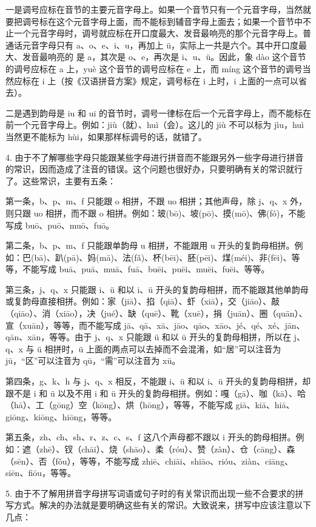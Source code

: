 一是调号应标在音节的主要元音字母上。如果一个音节只有一个元音字母，当然就要把调号标在这个元音字母上面，而不能标到辅音字母上面去；如果一个音节中不止一个元音字母时，调号就应标在开口度最大、发音最响亮的那个元音字母上。普通话元音字母只有 a、o、e、i、u，再加上 ü，实际上一共是六个。其中开口度最大、发音最响亮的 是 a，其次是 o、e，再次是 i、u、ü。因此，象 dào 这个音节的调号应标在 a 上，yuè 这个音节的调号应标在 e 上，而 míng 这个音节的调号当然应标在 i 上（按《汉语拼音方案》规定，调号标在 i 上时，i 上面的一点可以省去）。

二是遇到韵母是 iu 和 ui 的音节时，调号一律标在后一个元音字母上，而不能标在前一个元音字母上。例如：jiù（就）、huì（会）。这儿的 jiù 不可以标为 jìu，huì 当然更不能标为 hùi，如果那样标调号的话，就错了。

4. 由于不了解哪些字母只能跟某些字母进行拼音而不能跟另外一些字母进行拼音的常识，因而造成了注音的错误。这个问题也很好办，只要明确有关的常识就行了。这些常识，主要有五条：

第一条，b、p、m、f 只能跟 o 相拼，不跟 uo 相拼；其他声母，除 j、q、x 外，则只跟 uo 相拼，而不跟 o 相拼。例如：玻(bō)、坡(pō)、摸(mō)、佛(fó)，不能写成 buō、puō、muō、fuō。

第二条，b、p、m、f 只能跟单韵母 u 相拼，不能跟用 u 开头的复韵母相拼。例如：巴(bā)、趴(pā)、妈(mā)、法(fǎ)、杯(bēi)、胚(pēi)、煤(méi)、非(fēi)、等等，不能写成 buā、puā、muā、fuā、buēi、puēi、muēi、fuēi、等等。

第三条，j、q、x 只能跟 i、ü 和以 i、ü 开头的复韵母相拼，而不能跟其他单韵母或复韵母直接相拼。例如：家（jiā）、掐（qiā）、虾（xiā），交（jiāo）、敲（qiāo）、消（xiāo），决（jué）、缺（quē）、靴（xuē），捐（juān）、圈（quān）、宣（xuān），等等，而不能写成 jā、qā、xā、jāo、qāo、xāo、jé、qé、xé、jān、qān、xān，等等。由于 j、q、x 只能跟 ü 和以 ü 开头的复韵母相拼，所以在 j、q、x 与 ü 相拼时，ü 上面的两点可以去掉而不会混淆，如“居”可以注音为 jū，“区”可以注音为 qū，“需”可以注音为 xū。
\newpage

第四条，g、k、h 与 j、q、x 相反，不能跟 i、ü 和以 i、ü 开头的复韵母相拼，却跟不是 i 和 ü 以及不用 i 和 ü 开头的复韵母相拼。例如：嘎（gā）、咖（kā）、哈（hā）、工（gōng）空（kōng）、烘（hōng），等等，不能写成 giā、kiā、hiā、giōng、kiōng、hiōng，等等。

第五条，zh、ch、sh、r、z、c、s、f 这八个声母都不跟以 i 开头的韵母相拼。例如：遮（zhē）、钗（chāi）、烧（shāo）、柔（róu）、赞（zàn）、仓（cāng）、森（sēn）、否（fǒu），等等，不能写成 zhiē、chiāi、shiāo、rióu、ziàn、ciāng、siēn、fiōu，等等。

5. 由于不了解用拼音字母拼写词语或句子时的有关常识而出现一些不合要求的拼写方式。解决的办法就是要明确这些有关的常识。大致说来，拼写中应该注意以下几点：

